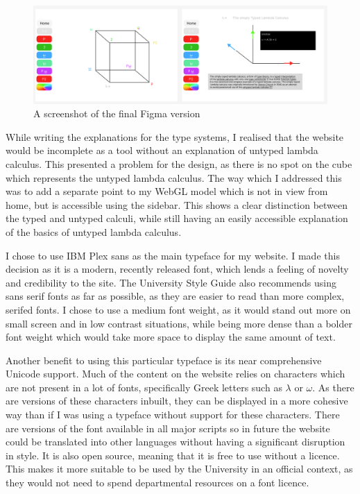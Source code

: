 \documentclass{l4proj}
\begin{document}
\begin{figure}[h!]
    \centering
    \includegraphics[width=1\linewidth]{dissertation/images/v2_full.png}
    \caption{A screenshot of the final Figma version}
    \label{fig:enter-label}
\end{figure}

While writing the explanations for the type systems, I realised that the website would be incomplete as a tool without an explanation of untyped lambda calculus.  This presented a problem for the design, as there is no spot on the cube which represents the untyped lambda calculus.  The way which I addressed this was to add a separate point to my WebGL model which is not in view from home, but is accessible using the sidebar.  This shows a clear distinction between the typed and untyped calculi, while still having an easily accessible explanation of the basics of untyped lambda calculus.

I chose to use IBM Plex sans as the main typeface for my website.  I made this decision as it is a modern, recently released font, which lends a feeling of novelty and credibility to the site.  The University Style Guide also recommends using sans serif fonts as far as possible, as they are easier to read than more complex, serifed fonts.  I chose to use a medium font weight, as it would stand out more on small screen and in low contrast situations, while being more dense than a bolder font weight which would take more space to display the same amount of text.

Another benefit to using this particular typeface is its near comprehensive Unicode support.  Much of the content on the website relies on characters which are not present in a lot of fonts, specifically Greek letters such as $\lambda$ or $\omega$.  As there are versions of these characters inbuilt, they can be displayed in a more cohesive way than if I was using a typeface without support for these characters.  There are versions of the font available in all major scripts so in future the website could be translated into other languages without having a significant disruption in style.  It is also open source, meaning that it is free to use without a licence.  This makes it more suitable to be used by the University in an official context, as they would not need to spend departmental resources on a font licence.
\end{document}
